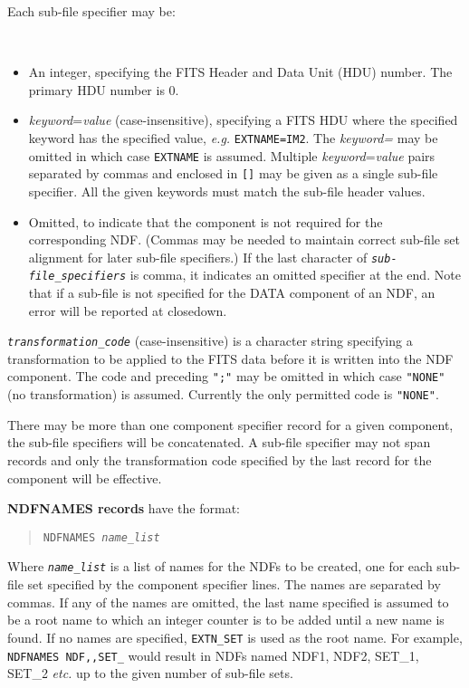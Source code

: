 \documentclass[twoside,11pt]{article}
\newcommand{\latex}[1]{#1}
\newcommand{\ssthitemlist}[1]{
  \latex{
  \mbox{} \\
  \vspace{-3.5ex}
  }
  \begin{itemize}
     #1
  \end{itemize}
}
\newcommand{\sstitem}{\item}
\newcommand{\sstitem}{\item}
\begin{document}
{{{{              Each sub-file specifier may be:
              \ssthitemlist{
              \sstitem
              An integer, specifying the FITS Header and Data Unit (HDU)
                 number. The primary HDU number is 0.
              \sstitem
              \textit{keyword}=\textit{value} (case-insensitive), specifying 
                 a FITS HDU
                 where the specified keyword has the specified value,
                 \textit{e.g.} \texttt{EXTNAME=IM2}.
                 The \textit{keyword=} may be omitted in which
                 case \texttt{EXTNAME} is assumed.
                 Multiple \textit{keyword}=\textit{value} pairs separated by
                 commas and enclosed
                 in \texttt{[]} may be given as a single sub-file specifier.
                 All the given keywords must match the sub-file header values.
              \sstitem
              Omitted, to indicate that the component is not required
                 for the corresponding NDF. (Commas may be needed to maintain
                 correct sub-file set alignment for later sub-file
                 specifiers.) If the last character of 
                 \texttt{\textit{sub-file\_specifiers}} is comma, it
                 indicates an omitted specifier at the end.
                 Note that if a sub-file is not specified for the DATA
                 component of an NDF, an error will be reported at closedown.
              }
           \sstitem
           \texttt{\textit{transformation\_code}} (case-insensitive) is a 
              character string specifying a  transformation to be applied to
              the FITS data before it is written into the NDF component.
              The code and
              preceding \texttt{";"} may be omitted in which case \texttt{"NONE"} (no
              transformation) is assumed.  Currently the only permitted code
              is \texttt{"NONE"}.
           }
          There may be more than one component specifier record for a given
          component, the sub-file specifiers will be concatenated. A
          sub-file specifier may not span records and only the transformation
          code specified by the last record for the component will be
          effective.
          \medskip

        \textbf{NDFNAMES records} have the format:
          \begin{quote}
          \texttt{NDFNAMES \textit{name\_list}}
          \end{quote}
           Where \texttt{\textit{name\_list}} is a list of names for the NDFs
           to be created, one
           for each sub-file set specified by the component specifier lines.
           The names are separated by commas. If any of the names are omitted,
           the last name specified is assumed to be a root name to which an
           integer counter is to be added until a new name is found.  If no
           names are specified, \texttt{EXTN\_SET} is used as the root name.
           For example,  \texttt{NDFNAMES NDF,,SET\_}
           would result in NDFs named NDF1, NDF2, SET\_1, SET\_2 \textit{etc.}
           up to the given number of sub-file sets.

}}}
\end{document}
